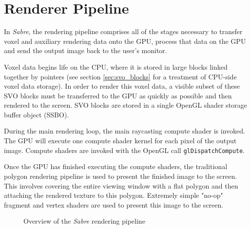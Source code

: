 \section{Renderer Pipeline}
In \textit{Sabre}, the rendering pipeline comprises all of the stages necessary to transfer voxel and auxiliary rendering data onto the GPU, process that data on the GPU and send the output image back to the user's monitor.

Voxel data begins life on the CPU, where it is stored in large blocks linked together by pointers (see section \ref{sec:svo_blocks} for a treatment of CPU-side voxel data storage). In order to render this voxel data, a visible subset of these SVO blocks must be transferred to the GPU as quickly as possible and then rendered to the screen. SVO blocks are stored in a single OpenGL shader storage buffer object (SSBO). 

During the main rendering loop, the main raycasting compute shader is invoked. The GPU will execute one compute shader kernel for each pixel of the output image. Compute shaders are invoked with the OpenGL call \texttt{glDispatchCompute}.

Once the GPU has finished executing the compute shaders, the traditional polygon rendering pipeline is used to present the finished image to the screen. This involves covering the entire viewing window with a flat polygon and then attaching the rendered texture to this polygon. Extremely simple "no-op" fragment and vertex shaders are used to present this image to the screen.



\begin{figure}
    \centering
    \footnotesize
    
    \caption{Overview of the \textit{Sabre} rendering pipeline}
    \label{fig:render_pipeline}
\end{figure}